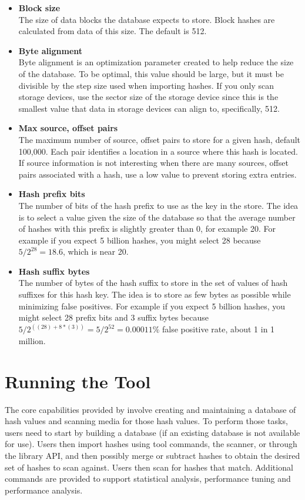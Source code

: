 \documentclass[11pt,fleqn]{article} %
\begin{document}
\begin{itemize}
\item \textbf{Block size}\\
The size of data blocks the database expects to store. Block hashes are calculated from data of this size. The default is 512.

\item \textbf{Byte alignment}\\
Byte alignment is an optimization parameter created to help reduce the size of the database. To be optimal, this value should be large, but it must be divisible by the step size used when importing hashes. If you only scan storage devices, use the sector size of the storage device since this is the smallest value that data in storage devices can align to, specifically, 512.

\item \textbf{Max source, offset pairs}\\
The maximum number of source, offset pairs to store for a given hash, default 100,000. Each pair identifies a location in a source where this hash is located. If source information is not interesting when there are many sources, offset pairs associated with a hash, use a low value to prevent storing extra entries.

\item \textbf{Hash prefix bits}\\
The number of bits of the hash prefix to use as the key in the store. The idea is to select a value given the size of the database so that the average number of hashes with this prefix is slightly greater than 0, for example 20. For example if you expect 5 billion hashes, you might select 28 because $5/2^{28}=18.6$, which is near 20.

\item \textbf{Hash suffix bytes}\\
The number of bytes of the hash suffix to store in the set of values of hash suffixes for this hash key. The idea is to store as few bytes as possible while minimizing false positives. For example if you expect 5 billion hashes, you might select 28 prefix bits and 3 suffix bytes because $5 / 2^{((28) + 8*(3))} = 5 / 2^{52} = 0.00011\%$ false positive rate, about 1 in 1 million.
\end{itemize}

\section {Running the \hdb Tool}
\label{Running}
The core capabilities provided by \hdb involve creating and maintaining a database of hash values and scanning media for those hash values. To perform those tasks, \hdb users need to start by building a database (if an existing database is not available for use).
Users then import hashes using \hdb tool commands, the \hdb \bulk scanner, or through the \hdb library API, and then possibly merge or subtract hashes to obtain the desired set of hashes to scan against.
Users then scan for hashes that match.
Additional commands are provided to support statistical analysis, performance tuning and performance analysis.\\
\end{document}
